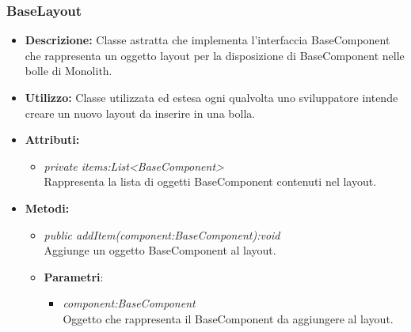 \subsubsection{BaseLayout}
\begin{itemize}
\item \textbf{Descrizione:} Classe astratta che implementa l'interfaccia BaseComponent che rappresenta un oggetto layout per la disposizione di BaseComponent nelle bolle di Monolith.
\item \textbf{Utilizzo:} Classe utilizzata ed estesa ogni qualvolta uno sviluppatore intende creare un nuovo layout da inserire in una bolla.
\item \textbf{Attributi:}
\begin{itemize}
\item \textit{private items:List<BaseComponent>}\\
Rappresenta la lista di oggetti BaseComponent contenuti nel layout.
\end{itemize}
\item \textbf{Metodi:}
\begin{itemize}
\item \textit{public addItem(component:BaseComponent):void}\\
Aggiunge un oggetto BaseComponent al layout.
\item{\textbf{Parametri}: \begin{itemize}
\item \textit{component:BaseComponent}\\
Oggetto che rappresenta il BaseComponent da aggiungere al layout.
\end{itemize}}
\end{itemize}
\end{itemize}


